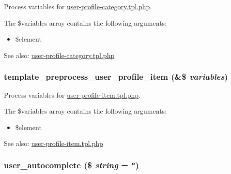 Process variables for \hyperlink{user-profile-category_8tpl_8php}{user-profile-category.tpl.php}.

The \$variables array contains the following arguments:\begin{itemize}
\item \$element\end{itemize}


\begin{Desc}
\item[See also:]\hyperlink{user-profile-category_8tpl_8php}{user-profile-category.tpl.php} \end{Desc}
\hypertarget{user_8pages_8inc_b6e6ed16b5647c626cc0468506abd3e9}{
\subsubsection[{template\_\-preprocess\_\-user\_\-profile\_\-item}]{\setlength{\rightskip}{0pt plus 5cm}template\_\-preprocess\_\-user\_\-profile\_\-item (\&\$ {\em variables})}}
\label{user_8pages_8inc_b6e6ed16b5647c626cc0468506abd3e9}


Process variables for \hyperlink{user-profile-item_8tpl_8php}{user-profile-item.tpl.php}.

The \$variables array contains the following arguments:\begin{itemize}
\item \$element\end{itemize}


\begin{Desc}
\item[See also:]\hyperlink{user-profile-item_8tpl_8php}{user-profile-item.tpl.php} \end{Desc}
\hypertarget{user_8pages_8inc_3a77600d6ab7b9af11a3692207b5533a}{
\subsubsection[{user\_\-autocomplete}]{\setlength{\rightskip}{0pt plus 5cm}user\_\-autocomplete (\$ {\em string} = {\tt ''})}}
\label{user_8pages_8inc_3a77600d6ab7b9af11a3692207b5533a}


